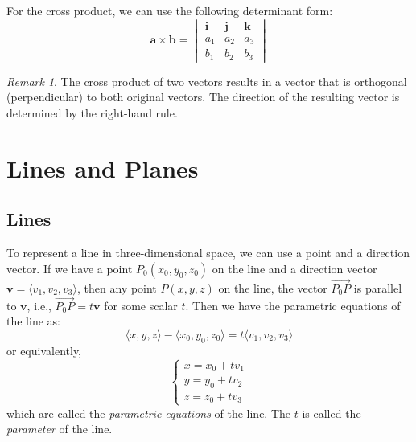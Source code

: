 \documentclass{book}
\theoremstyle{remark}
\newtheorem*{remark}{Remark}
\begin{document}
For the cross product, we can use the following determinant form:
\[
    \mathbf{a} \times \mathbf{b} = \begin{vmatrix}
    \mathbf{i} & \mathbf{j} & \mathbf{k} \\
    a_1 & a_2 & a_3 \\
    b_1 & b_2 & b_3
    \end{vmatrix}
\]

\begin{remark}
    The cross product of two vectors results in a vector that is orthogonal (perpendicular) to both original vectors. The direction of the resulting vector is determined by the right-hand rule.
\end{remark}

\section{Lines and Planes}

\subsection{Lines}

To represent a line in three-dimensional space, we can use a point and a direction vector. If we have a point $P_0(x_0, y_0, z_0)$ on the line and a direction vector $\mathbf{v} = \langle v_1, v_2, v_3 \rangle$, then any point $P(x, y, z)$ on the line, the vector $\overrightarrow{P_0P}$ is parallel to $\mathbf{v}$, i.e., $\overrightarrow{P_0P} = t\mathbf{v}$ for some scalar $t$. Then we have the parametric equations of the line as:
\[
    \langle x, y, z \rangle - \langle x_0, y_0, z_0 \rangle = t \langle v_1, v_2, v_3 \rangle
\]
or equivalently,
\[
    \begin{cases}
        x = x_0 + tv_1 \\
        y = y_0 + tv_2 \\
        z = z_0 + tv_3
    \end{cases}
\]
which are called the \emph{parametric equations} of the line. The $t$ is called the \emph{parameter} of the line.
\end{document}
